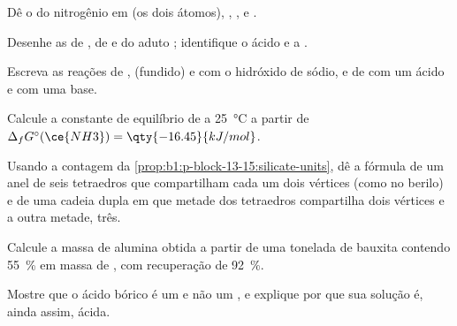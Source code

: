 \begin{exercise}[$\star$]\label{exo:b1:p-block-13-15:1}
Dê o  do nitrogênio em  (os dois átomos),
, ,  e .
\end{exercise}

\begin{exercise}[$\star$]\label{exo:b1:p-block-13-15:2}
Desenhe as  de , de  e do aduto
; identifique o ácido e a .
\end{exercise}

\begin{exercise}[$\star$]\label{exo:b1:p-block-13-15:3}
Escreva as reações de ,  (fundido) e  com o
hidróxido de sódio, e de  com um ácido e com uma base.
\end{exercise}

\begin{exercise}[$\star$]\label{exo:b1:p-block-13-15:4}
Calcule a constante de equilíbrio de  a
\qty{25}{\celsius} a partir de $\Delta_f G^\circ(\ce{NH3}) =
\qty{-16.45}{kJ/mol}$.
\end{exercise}

\begin{exercise}[$\star\star$]\label{exo:b1:p-block-13-15:5}
Usando a contagem da \cref{prop:b1:p-block-13-15:silicate-units}, dê a
fórmula de um anel de seis tetraedros que compartilham cada um dois
vértices (como no berilo) e de uma cadeia dupla em que metade dos
tetraedros compartilha dois vértices e a outra metade, três.
\end{exercise}

\begin{exercise}[$\star\star$]\label{exo:b1:p-block-13-15:6}
Calcule a massa de alumina obtida a partir de uma tonelada de bauxita
contendo \qty{55}{\percent} em massa de , com recuperação de
\qty{92}{\percent}.
\end{exercise}

\begin{exercise}[$\star\star$]\label{exo:b1:p-block-13-15:7}
Mostre que o ácido bórico é um  e não um ,
e explique por que sua solução é, ainda assim, ácida.
\end{exercise}

